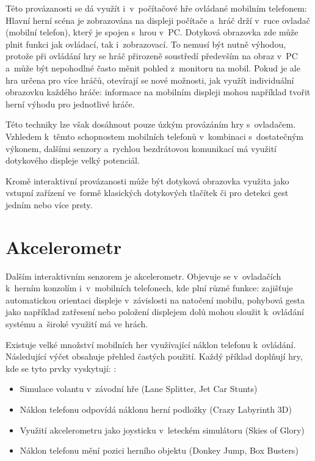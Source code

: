 \documentclass[thesis=B,czech,hidelinks]{FITthesis}[2012/06/26] %
\begin{document}
Této provázanosti se dá využít i~v~počítačové hře ovládané mobilním telefonem: Hlavní herní scéna je zobrazována na displeji počítače a~hráč drží v~ruce ovladač (mobilní telefon), který je spojen s~hrou v~PC. Dotyková obrazovka zde může plnit funkci jak ovládací, tak i~zobrazovací. To nemusí být nutně výhodou, protože při ovládání hry se hráč přirozeně soustředí především na obraz v~PC a~může být nepohodlné často měnit pohled z~monitoru na mobil. Pokud je ale hra určena pro více hráčů, otevírají se nové možnosti, jak využít individuální obrazovku každého hráče: informace na mobilním displeji mohou například tvořit herní výhodu pro jednotlivé hráče.

Této techniky lze však dosáhnout pouze úzkým provázáním hry s~ovladačem. Vzhledem k~těmto schopnostem mobilních telefonů v~kombinaci s~dostatečným výkonem, dalšími senzory a~rychlou bezdrátovou komunikací má využití dotykového displeje velký potenciál.

Kromě interaktivní provázanosti může být dotyková obrazovka využita jako vstupní zařízení ve~formě klasických dotykových tlačítek či pro detekci gest jedním nebo více prsty.

\section{Akcelerometr}
\label{section:accelerometer}

Dalším interaktivním senzorem je akcelerometr. Objevuje se v~ovladačích k~herním konzolím i~v~mobilních telefonech, kde plní různé funkce: zajišťuje automatickou orientaci displeje v~závislosti na natočení mobilu, pohybová gesta jako například zatřesení nebo položení displejem dolů mohou sloužit k~ovládání systému a~široké využití má ve hrách.

Existuje velké množství mobilních her využívající náklon telefonu k~ovládání. Následující výčet obsahuje přehled častých použití. Každý příklad doplňují hry, kde se tyto prvky vyskytují: \cite{accelerometergames}:

\begin{itemize}
	\item Simulace volantu v~závodní hře (Lane Splitter, Jet Car Stunts)
	\item Náklon telefonu odpovídá náklonu herní podložky (Crazy Labyrinth 3D)
	\item Využití akcelerometru jako joysticku v~leteckém simulátoru (Skies of Glory)
	\item Náklon telefonu mění pozici herního objektu (Donkey Jump, Box Busters)
\end{itemize}
\end{document}
